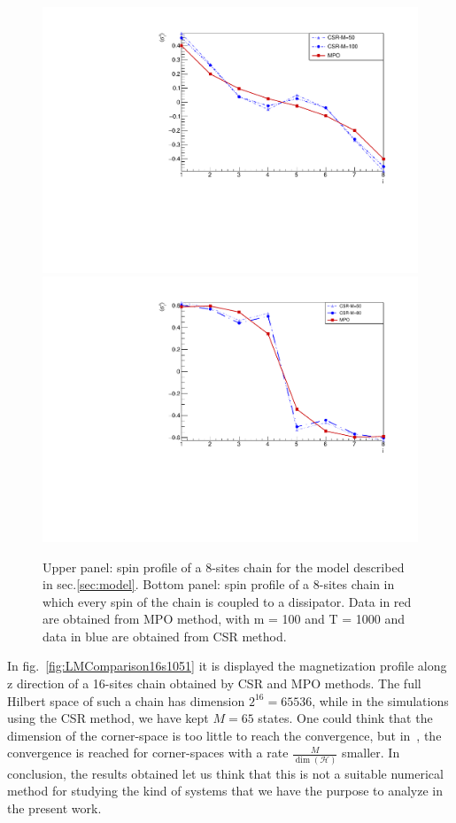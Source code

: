 \begin{figure}[H]
    \centering
    \includegraphics[scale=0.6]{Figures/8sites/1U1D_comparisonCSR_MPO_8site.pdf}
    \includegraphics[scale=0.6]{Figures/8sites/8sites_MPOvsCORNER_4U4D.pdf}
    \captionsetup{width=1.\linewidth}
    \caption{Upper panel: spin profile of a 8-sites chain for the model described in sec.\ref{sec:model}. Bottom panel: spin profile of a 8-sites chain in which every spin of the chain is coupled to a dissipator. Data in red are obtained from MPO method, with m = 100 and T = 1000 and data in blue are obtained from CSR method.}
    \label{fig:comparisonCSR_MPO_8site}
\end{figure}

In fig.~\ref{fig:LMComparison16s1051} it is displayed the magnetization profile along z direction of a 16-sites chain obtained by CSR and MPO methods. The full Hilbert space of such a chain has dimension $2^{16} = 65536$, while in the simulations using the CSR method, we have kept $M = 65$ states. One could think that the dimension of the corner-space is too little to reach the convergence, but in~\cite{PhysRevLett.115.080604}, the convergence is reached for corner-spaces with a rate $\frac{M}{\dim(\mathcal{H})}$ smaller. In conclusion, the results obtained let us think that this is not a suitable numerical method for studying the kind of systems that we have the purpose to analyze in the present work.

